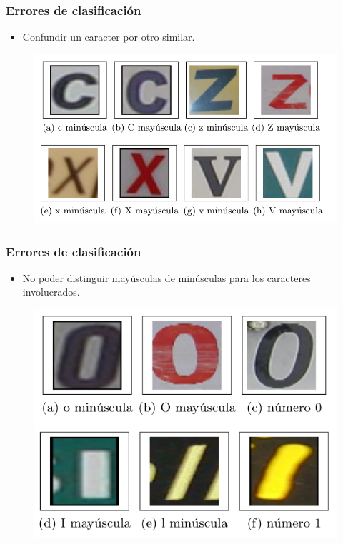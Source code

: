 		\begin{frame}
			\frametitle{Errores de clasificación}
			\begin{itemize}
				\item Confundir un caracter por otro similar.
			\end{itemize}
			\begin{figure}[htbp!]
				\centering
				\centerline{
					\includegraphics[height=0.50\paperheight]{imgs/error_may_min.png}
				}
			\end{figure}
		\end{frame}
		\begin{frame}
			\frametitle{Errores de clasificación}
			\begin{itemize}
				\item No poder distinguir mayúsculas de minúsculas para los caracteres involucrados.
			\end{itemize}
			\begin{figure}[htbp!]
				\centering
				\centerline{
					\includegraphics[height=0.50\paperheight]{imgs/error_conf_simbolos.png}
				}
			\end{figure}
		\end{frame}
